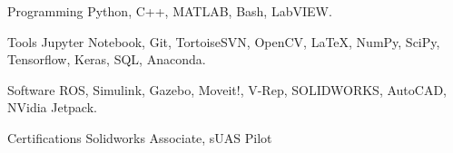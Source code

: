 

\begin{cvskills}

  \cvskill
    {Programming} %
    {Python, C++, MATLAB, Bash, LabVIEW.} %

  \cvskill
    {Tools} %
    {Jupyter Notebook, Git, TortoiseSVN, OpenCV, LaTeX, NumPy, SciPy, Tensorflow, Keras, SQL, Anaconda.} %


  \cvskill
    {Software} %
    {ROS, Simulink, Gazebo, Moveit!, V-Rep, SOLIDWORKS, AutoCAD, NVidia Jetpack.} %

  \cvskill
    {Certifications} %
    {Solidworks Associate, sUAS Pilot} %

\end{cvskills}
